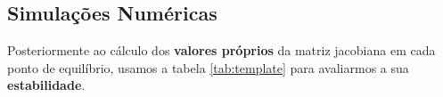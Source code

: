




\subsection{Simulações Numéricas}

\noindent
Posteriormente ao cálculo dos {\bf valores próprios} da matriz jacobiana em cada ponto de equilíbrio, usamos a tabela \ref{tab:template} para avaliarmos a sua {\bf estabilidade}.

